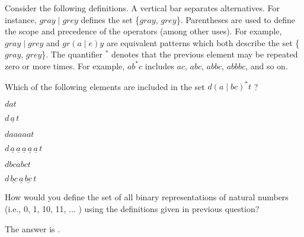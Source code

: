 \documentclass{ximera}
\begin{document}
Consider the following definitions.  
A vertical bar separates alternatives. For instance, $gray  \mid grey$ defines the set \{$gray$, $grey$\}.
Parentheses are used to define the scope and precedence of the operators (among other uses). For example, $gray \mid grey$ and $gr(a\mid e)y$ are equivalent patterns which both describe the set 
 \{$gray$, $grey$\}.
The quantifier $^*$ denotes that the previous element may be repeated zero or more times. 
 For example, $ab^*c$ includes $ac$, $abc$, $abbc$, $abbbc$, and so on.

Which of the following elements are included in the set $d (a \mid bc)^*t  $ ?

\begin{question}
$dat$
\begin{solution}
\begin{multipleChoice}
\end{multipleChoice}
\end{solution}
$d \, \underline{a} \, t$
\end{question}

\begin{question}
$daaaaat$
\begin{solution}
\begin{multipleChoice}
\end{multipleChoice}
\end{solution}
$d \, \underline{a} \, \underline{a} \, \underline{a} \, \underline{a} \, \underline{a} \, t$
\end{question}

\begin{question}
$dbcabct$
\begin{solution}
\begin{multipleChoice}
\end{multipleChoice}
\end{solution}
$d \, \underline{bc} \, \underline{a} \, \underline{bc} \, t$
\end{question}


\begin{question}
How would you define the set of all binary representations of natural numbers (i.e., 0, 1, 10, 11, ... ) using the definitions given in previous question?

\begin{solution}%
The answer is .
\end{solution}
\end{question}
\end{document}
